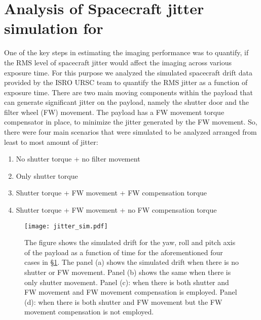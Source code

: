 \section{Analysis of Spacecraft jitter simulation for {\suit}}\label{sec:suit_jitter}

One of the key steps in estimating the imaging performance was to quantify, if the RMS level of spacecraft jitter would affect the imaging across various exposure time. For this purpose we analyzed the simulated spacecraft drift data provided by the ISRO URSC team to quantify the RMS jitter as a function of exposure time. There are two main moving components within the payload that can generate significant jitter on the payload, namely the shutter door and the filter wheel (FW) movement. The payload has a FW movement torque compensator in place, to minimize the jitter generated by the FW movement. So, there were four main scenarios that were simulated to be analyzed arranged from least to most amount of jitter:

\begin{enumerate}
    \item No shutter torque + no filter movement
    \item Only shutter torque
    \item Shutter torque + FW movement + FW compensation torque
    \item Shutter torque + FW movement + no FW compensation torque
\end{enumerate}

\begin{figure}
    \centering
    \texttt{[image: jitter\_sim.pdf]}
    \caption{The figure shows the simulated drift for the yaw, roll and pitch axis of the payload as a function of time for the aforementioned four cases in \S\ref{sec:suit_jitter}. The panel (a) shows the simulated drift when there is no shutter or FW movement. Panel (b) shows the same when there is only shutter movement. Panel (c): when there is both shutter and FW movement and FW movement compensation is employed. Panel (d): when there is both shutter and FW movement but the FW movement compensation is not employed.}
    \label{fig:jitter_sim}
\end{figure}

